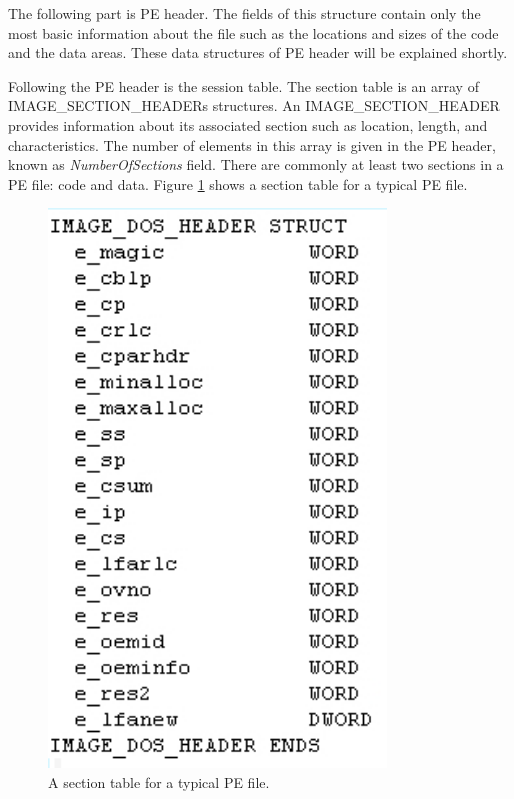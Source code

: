 The following part is PE header. The fields of this structure contain only the most basic information about the file such as the locations and sizes of the code and the data areas. These data structures of PE header will be explained shortly.

Following the PE header is the session table. The section table is an array of IMAGE\_SECTION\_HEADERs structures. An IMAGE\_SECTION\_HEADER provides information about its associated section such as location, length, and characteristics. The number of elements in this array is given in the PE header, known as \emph{NumberOfSections} field. There are commonly at least two sections in a PE file: code and data. Figure \ref{fig:pefiles1} shows a section table for a typical PE file.

\begin{figure}[h!]
\centering
\includegraphics[width=0.8\textwidth]{graph/dosHeaderStructure.png}
\caption{A section table for a typical PE file.}
\label{fig:pefiles1}
\end{figure}

